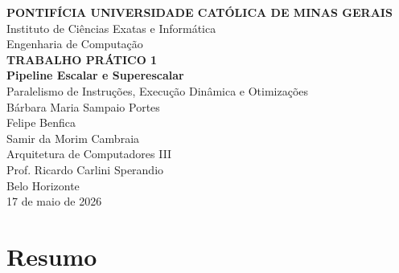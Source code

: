 \documentclass[12pt,a4paper]{article}
\begin{document}
\begin{titlepage}
    \centering
    \vspace*{1cm}
    
    {\Large \textbf{PONTIFÍCIA UNIVERSIDADE CATÓLICA DE MINAS GERAIS}} \\[0.5cm]
    {\large Instituto de Ciências Exatas e Informática} \\[0.3cm]
    {\large Engenharia de Computação} \\[3cm]
    
    {\Large \textbf{TRABALHO PRÁTICO 1}} \\[0.5cm]
    {\huge \textbf{Pipeline Escalar e Superescalar}} \\[0.3cm]
    {\Large Paralelismo de Instruções, Execução Dinâmica e Otimizações} \\[4cm]
    
    {\large
        Bárbara Maria Sampaio Portes \\
        Felipe Benfica \\
        Samir da Morim Cambraia \\[2cm]
    }
    \vfill
    {\large Arquitetura de Computadores III} \\
    {\large Prof. Ricardo Carlini Sperandio} \\[0.5cm]
    {\large Belo Horizonte} \\
    {\large 17 de maio de 2026}
\end{titlepage}

\tableofcontents
\newpage

\section*{Resumo}
\end{document}
